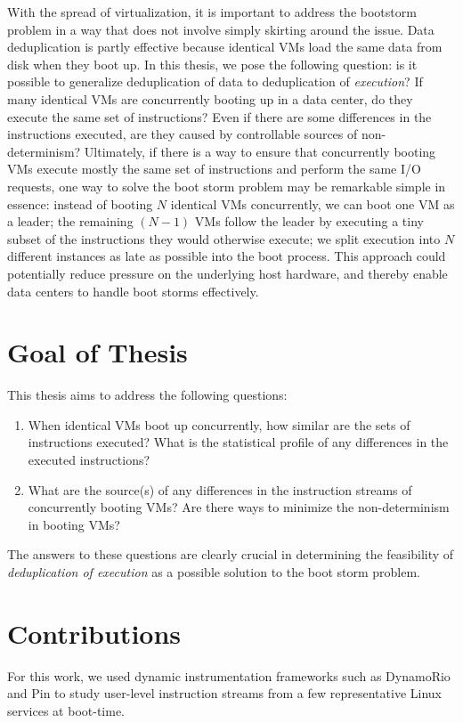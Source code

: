 With the spread of virtualization, it is important to address the
bootstorm problem in a way that does not involve simply skirting around the
issue. Data deduplication is partly effective because identical VMs load
the same data from disk when they boot up. In this thesis, we pose the following question: 
is it possible to generalize deduplication of data to deduplication of \emph{execution}?
If many identical VMs are concurrently booting up in a data center, 
do they execute the same set of instructions? Even if there are
some differences in the instructions executed, are they caused by
controllable sources of non-determinism? Ultimately, if there is a way
to ensure that concurrently booting VMs execute mostly the same set of instructions
and perform the same I/O requests, one way to solve the boot storm
problem may be remarkable simple in essence: instead of booting
$N$ identical VMs concurrently, we can boot one VM as a leader; the remaining $(N-1)$ VMs 
follow the leader by executing a tiny subset of the instructions they would otherwise execute;
we split execution into $N$ different instances as late as possible into the boot process. This approach
could potentially reduce pressure on the underlying host hardware,
and thereby enable data centers to handle boot storms effectively.

\section{Goal of Thesis}
This thesis aims to address the following questions:

\begin{enumerate}

\item When identical VMs boot up concurrently, how similar
are the sets of instructions executed? What is the statistical
profile of any differences in the executed instructions?

\item What are the source(s) of any differences in
the instruction streams of concurrently booting VMs?
Are there ways to minimize the non-determinism in
booting VMs?

\end{enumerate}

The answers to these questions are clearly crucial in determining
the feasibility of \emph{deduplication of execution} as a possible solution
to the boot storm problem. 

\section{Contributions}
For this work, we used dynamic instrumentation frameworks such as
DynamoRio \cite{bruening2004dr} and Pin \cite{luk2005pin}
to study user-level instruction streams from 
a few representative Linux services at boot-time. \newline


